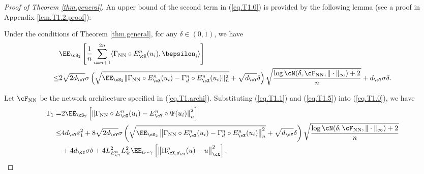 \documentclass[11pt]{article} %
\begin{document}
\begin{proof}[Proof of Theorem \ref{thm.general}]
 An upper bound of the second term in (\ref{eq.T1.0}) is provided by the following lemma (see a proof in Appendix \ref{lem.T1.2.proof}):
 \begin{lemma}\label{lem.T1.2}
 	Under the conditions of Theorem \ref{thm.general}, for any $\delta\in (0,1)$, we have 
 	\begin{align}
 		&\EE_{\cS_2}\left[\frac{1}{n}\sum_{i=n+1}^{2n}\langle \Gamma_{\rm NN} \circ E_{\cX}^n(u_i), \bepsilon_i\rangle\right] \nonumber\\
 		\leq & 2\sqrt{2d_{\cY}}\sigma\left(\sqrt{\EE_{\cS_2}\|\Gamma_{\rm NN} \circ E_{\cX}^n(u_i)-\Gamma_{d}^n \circ E_{\cX}^n(u_i)\|_n^2}+\sqrt{d_{\cY}}\delta \right)\sqrt{\frac{\log \cN(\delta,\cF_{\rm NN}, \|\cdot\|_{\infty}) +2}{n}} +d_{\cY}\sigma\delta.
 		\label{eq.T1.5}
 	\end{align}
 \end{lemma}
 
 Let $\cF_{\rm NN}$ be the network architecture specified in (\ref{eq.T1.archi}). Substituting (\ref{eq.T1.1}) and (\ref{eq.T1.5}) into (\ref{eq.T1.0}), we have
 \begin{align}
 	{\rm T_1}=&2\EE_{\cS_2}\left[\left\| \Gamma_{\rm NN} \circ E_{\cX}^n(u_i)- E_{\cY}^n\circ\Psi(u_i)\right\|_{n}^2\right]\nonumber\\
 	\leq& 4d_{\cY}\varepsilon_1^2+ 8\sqrt{2d_{\cY}}\sigma\left(\sqrt{\EE_{\cS_2}\left\|\Gamma_{\rm NN} \circ E_{\cX}^n(u_i)-\Gamma_{d}^n \circ E_{\cX}^n(u_i)\right\|_n^2}+\sqrt{d_{\cY}}\delta \right)\sqrt{\frac{\log \cN(\delta,\cF_{\rm NN}, \|\cdot\|_{\infty}) +2}{n}} \nonumber\\
 	& +4d_{\cY}\sigma\delta +4L_{E^n_{\cY}}^2L_{\Psi}^2\EE_{u\sim \gamma}\left[ \left\| \Pi_{\cX,d_{\cX}}^n(u)- u\right\|_{\cX}^2\right] .
 	\label{eq.T1.6}
 \end{align}
 

\end{proof}
\end{document}
